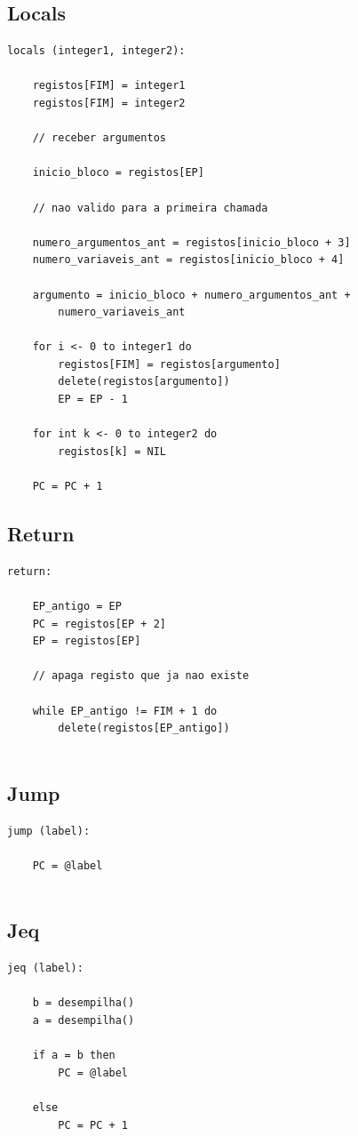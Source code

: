 \documentclass[a4paper,12pt,headings=small]{article}
\begin{document}
\newpage

\subsection{Locals}
\begin{lstlisting}
locals (integer1, integer2):

	registos[FIM] = integer1
	registos[FIM] = integer2
	
	// receber argumentos
	
	inicio_bloco = registos[EP]
	
	// nao valido para a primeira chamada
	
	numero_argumentos_ant = registos[inicio_bloco + 3]
	numero_variaveis_ant = registos[inicio_bloco + 4]
	
	argumento = inicio_bloco + numero_argumentos_ant +
		numero_variaveis_ant
		
	for i <- 0 to integer1 do
		registos[FIM] = registos[argumento]
		delete(registos[argumento])
		EP = EP - 1
	
	for int k <- 0 to integer2 do
		registos[k] = NIL
		
	PC = PC + 1

\end{lstlisting}


\subsection{Return}
\begin{lstlisting}
return:

	EP_antigo = EP
	PC = registos[EP + 2]
	EP = registos[EP]
	
	// apaga registo que ja nao existe	
	
	while EP_antigo != FIM + 1 do
		delete(registos[EP_antigo])
		
\end{lstlisting}

\newpage

\subsection{Jump}
\begin{lstlisting}
jump (label):

	PC = @label
		
\end{lstlisting}


\subsection{Jeq}
\begin{lstlisting}
jeq (label):

	b = desempilha()
	a = desempilha()
	
	if a = b then
		PC = @label
		
	else
		PC = PC + 1	
	
\end{lstlisting}
\end{document}
